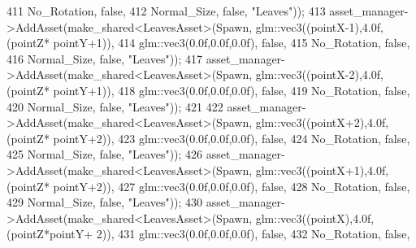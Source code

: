 \begin{DoxyCode}
411                                                              No\_Rotation, \textcolor{keyword}{false},
412                                                              Normal\_Size, \textcolor{keyword}{false}, \textcolor{stringliteral}{"Leaves"}));
413             asset\_manager->AddAsset(make\_shared<LeavesAsset>(Spawn, glm::vec3((pointX-1),4.0f,(pointZ*
      pointY+1)),
414                                                              glm::vec3(0.0f,0.0f,0.0f), \textcolor{keyword}{false},
415                                                              No\_Rotation, \textcolor{keyword}{false},
416                                                              Normal\_Size, \textcolor{keyword}{false}, \textcolor{stringliteral}{"Leaves"}));
417             asset\_manager->AddAsset(make\_shared<LeavesAsset>(Spawn, glm::vec3((pointX-2),4.0f,(pointZ*
      pointY+1)),
418                                                              glm::vec3(0.0f,0.0f,0.0f), \textcolor{keyword}{false},
419                                                              No\_Rotation, \textcolor{keyword}{false},
420                                                              Normal\_Size, \textcolor{keyword}{false}, \textcolor{stringliteral}{"Leaves"}));
421 
422             asset\_manager->AddAsset(make\_shared<LeavesAsset>(Spawn, glm::vec3((pointX+2),4.0f,(pointZ*
      pointY+2)),
423                                                              glm::vec3(0.0f,0.0f,0.0f), \textcolor{keyword}{false},
424                                                              No\_Rotation, \textcolor{keyword}{false},
425                                                              Normal\_Size, \textcolor{keyword}{false}, \textcolor{stringliteral}{"Leaves"}));
426             asset\_manager->AddAsset(make\_shared<LeavesAsset>(Spawn, glm::vec3((pointX+1),4.0f,(pointZ*
      pointY+2)),
427                                                              glm::vec3(0.0f,0.0f,0.0f), \textcolor{keyword}{false},
428                                                              No\_Rotation, \textcolor{keyword}{false},
429                                                              Normal\_Size, \textcolor{keyword}{false}, \textcolor{stringliteral}{"Leaves"}));
430             asset\_manager->AddAsset(make\_shared<LeavesAsset>(Spawn, glm::vec3((pointX),4.0f,(pointZ*pointY+
      2)),  
431                                                              glm::vec3(0.0f,0.0f,0.0f), \textcolor{keyword}{false},
432                                                              No\_Rotation, \textcolor{keyword}{false},

\end{DoxyCode}
